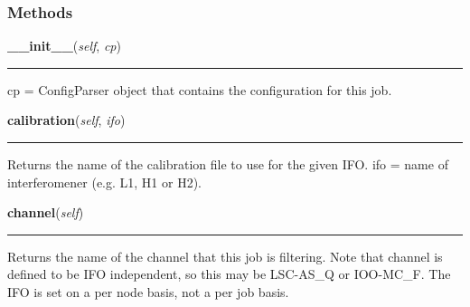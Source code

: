   \subsubsection{Methods}

    \label{pipeline:AnalysisJob:__init__}
    \vspace{0.5ex}

    \noindent\begin{boxedminipage}{\textwidth}

    \raggedright \textbf{\_\_init\_\_}(\textit{self}, \textit{cp})

    \vspace{-1.5ex}

    \rule{\textwidth}{0.5\fboxrule}
    cp = ConfigParser object that contains the configuration for this 
    job.

    \vspace{1ex}

    \end{boxedminipage}

    \label{pipeline:AnalysisJob:calibration}
    \vspace{0.5ex}

    \noindent\begin{boxedminipage}{\textwidth}

    \raggedright \textbf{calibration}(\textit{self}, \textit{ifo})

    \vspace{-1.5ex}

    \rule{\textwidth}{0.5\fboxrule}
    Returns the name of the calibration file to use for the given IFO. 
    ifo = name of interferomener (e.g. L1, H1 or H2).

    \vspace{1ex}

    \end{boxedminipage}

    \label{pipeline:AnalysisJob:channel}
    \vspace{0.5ex}

    \noindent\begin{boxedminipage}{\textwidth}

    \raggedright \textbf{channel}(\textit{self})

    \vspace{-1.5ex}

    \rule{\textwidth}{0.5\fboxrule}
    Returns the name of the channel that this job is filtering. Note that 
    channel is defined to be IFO independent, so this may be LSC-AS\_Q or 
    IOO-MC\_F. The IFO is set on a per node basis, not a per job basis.

    \vspace{1ex}

    \end{boxedminipage}


